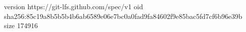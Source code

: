version https://git-lfs.github.com/spec/v1
oid sha256:85c19a8b5b5b4b6ab6589e06e7bc0a0fad9fa84602f9e85bac5fd7cf6b96e39b
size 174916
